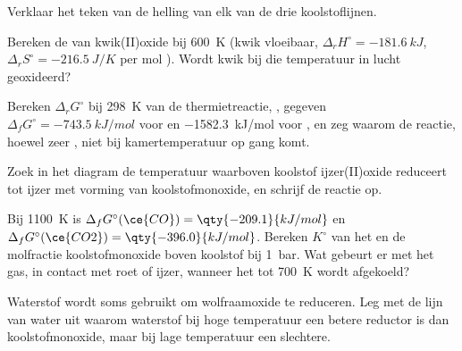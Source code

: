 \begin{exercise}[$\star$]\label{exo:b2:ellingham:4}
Verklaar het teken van de helling van elk van de drie koolstoflijnen.
\end{exercise}

\begin{exercise}[$\star\star$]\label{exo:b2:ellingham:5}
Bereken de  van kwik(II)oxide bij \qty{600}{K}
(kwik vloeibaar, $\Delta_r H^\circ = \qty{-181.6}{kJ}$, $\Delta_r S^\circ =
\qty{-216.5}{J/K}$ per mol ). Wordt kwik bij die temperatuur in lucht geoxideerd?
\end{exercise}

\begin{exercise}[$\star\star$]\label{exo:b2:ellingham:6}
Bereken $\Delta_r G^\circ$ bij \qty{298}{K} van de thermietreactie, , gegeven $\Delta_f G^\circ = \qty{-743.5}{kJ/mol}$ voor
 en \qty{-1582.3}{kJ/mol} voor , en zeg waarom de reactie,
hoewel zeer , niet bij kamertemperatuur op gang komt.
\end{exercise}

\begin{exercise}[$\star\star$]\label{exo:b2:ellingham:7}
Zoek in het diagram de temperatuur waarboven koolstof ijzer(II)oxide reduceert
tot ijzer met vorming van koolstofmonoxide, en schrijf de reactie op.
\end{exercise}

\begin{exercise}[$\star\star$]\label{exo:b2:ellingham:8}
Bij \qty{1100}{K} is $\Delta_f G^\circ(\ce{CO}) = \qty{-209.1}{kJ/mol}$ en
$\Delta_f G^\circ(\ce{CO2}) = \qty{-396.0}{kJ/mol}$. Bereken $K^\circ$ van het
 en de molfractie koolstofmonoxide boven koolstof bij
\qty{1}{bar}. Wat gebeurt er met het gas, in contact met roet of ijzer, wanneer het
tot \qty{700}{K} wordt afgekoeld?
\end{exercise}

\begin{exercise}[$\star\star$]\label{exo:b2:ellingham:9}
Waterstof wordt soms gebruikt om wolfraamoxide te reduceren. Leg met de lijn van water
uit waarom waterstof bij hoge temperatuur een betere reductor is dan koolstofmonoxide,
maar bij lage temperatuur een slechtere.
\end{exercise}

